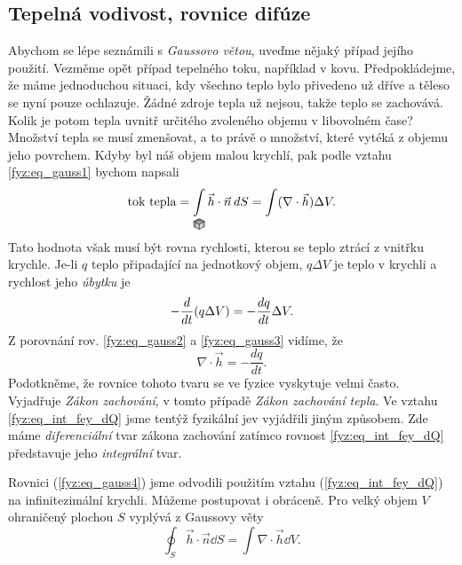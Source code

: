 {    %
    \subsection{Tepelná vodivost, rovnice difúze}
      Abychom se lépe seznámili s \emph{Gaussovo větou}, uveďme nějaký případ jejího použití. 
      Vezměme opět případ tepelného toku, například v kovu. Předpokládejme, že máme jednoduchou 
      situaci, kdy všechno teplo bylo přivedeno už dříve a těleso se nyní pouze ochlazuje. Žádné 
      zdroje tepla už nejsou, takže teplo se zachovává. Kolik je potom tepla uvnitř určitého 
      zvoleného objemu v libovolném čase? Množství tepla se musí zmenšovat, a to právě o množství, 
      které vytéká z objemu jeho povrchem. Kdyby byl náš objem malou krychlí, pak podle vztahu
      \ref{fyz:eq_gauss1} bychom napsali
      \begin{equation}\label{fyz:eq_gauss2}
       \text{tok tepla}=\limitint_{\mathclap{\substack{\cube}}}\vec{h}\cdot\vec{n}\dd{S} = 
       \int(\nabla\cdot\vec{h})\Delta V.
      \end{equation}
      Tato hodnota však musí být rovna rychlosti, kterou se teplo ztrácí z vnitřku krychle. Je-li 
      $q$ teplo připadající na jednotkový objem, $q\Delta V$ je teplo v krychli a rychlost jeho
      \emph{úbytku} je
      \begin{equation}\label{fyz:eq_gauss3}
       - \frac{d  }{d t}(q\Delta V) = - \frac{d q}{d t}\Delta V.
      \end{equation}
      Z porovnání rov. \ref{fyz:eq_gauss2} a \ref{fyz:eq_gauss3} vidíme, že 
      \begin{equation}\label{fyz:eq_gauss4}
        \nabla\cdot\vec{h} = - \frac{dq}{dt}. 
      \end{equation}
      Podotkněme, že rovnice tohoto tvaru se ve fyzice vyskytuje velmi často. Vyjadřuje \emph{Zákon 
      zachování}, v tomto případě \emph{Zákon zachování tepla}. Ve vztahu \ref{fyz:eq_int_fey_dQ} 
      jsme tentýž fyzikální jev vyjádřili jiným způsobem. Zde máme \emph{diferenciální} tvar zákona 
      zachování zatímco rovnost \ref{fyz:eq_int_fey_dQ} představuje jeho \emph{integrální} tvar.
      
      Rovnici (\ref{fyz:eq_gauss4}) jsme odvodili použitím vztahu (\ref{fyz:eq_int_fey_dQ}) na 
      infinitezimální krychli. Můžeme postupovat i obráceně. Pro velký objem \(V\) ohraničený 
      plochou \(S\) vyplývá z Gaussovy věty
      \begin{equation}\label{fyz:eq_gauss5}
        \oint_S\vec{h}\cdot\vec{n}\dd{S} = \int\nabla\cdot\vec{h}\dd{V}.
      \end{equation}
      
}
